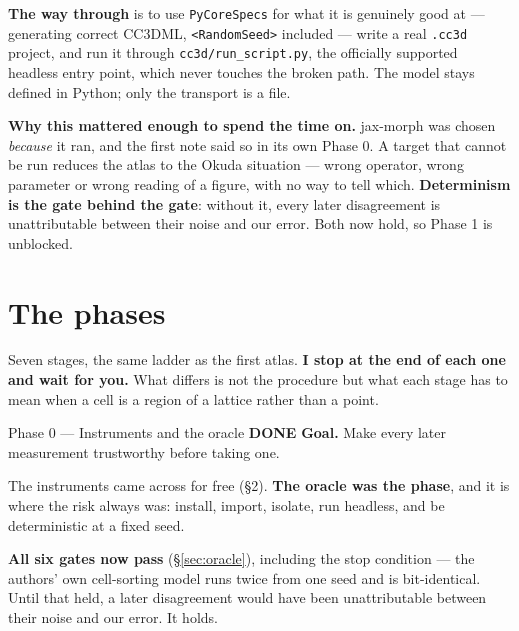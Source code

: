 \documentclass[11pt,a4paper]{article}
\newcommand{\code}[1]{\texttt{#1}}
\newcommand{\done}{\textcolor{good}{\textbf{DONE}}}
\begin{document}
\textbf{The way through} is to use \code{PyCoreSpecs} for what it is genuinely good at ---
generating correct CC3DML, \code{<RandomSeed>} included --- write a real \code{.cc3d} project, and
run it through \code{cc3d/run\_script.py}, the officially supported headless entry point, which
never touches the broken path. The model stays defined in Python; only the transport is a file.

\textbf{Why this mattered enough to spend the time on.} jax-morph was chosen \emph{because} it ran,
and the first note said so in its own Phase 0. A target that cannot be run reduces the atlas to the
Okuda situation --- wrong operator, wrong parameter or wrong reading of a figure, with no way to
tell which. \textbf{Determinism is the gate behind the gate}: without it, every later disagreement
is unattributable between their noise and our error. Both now hold, so Phase 1 is unblocked.

\section{The phases}

Seven stages, the same ladder as the first atlas. \textbf{I stop at the end of each one and wait
for you.} What differs is not the procedure but what each stage has to mean when a cell is a
region of a lattice rather than a point.

\begin{phasebox}{Phase 0 --- Instruments and the oracle \hfill \done}
\textbf{Goal.} Make every later measurement trustworthy before taking one.

The instruments came across for free (\S2). \textbf{The oracle was the phase}, and it is where the
risk always was: install, import, isolate, run headless, and be deterministic at a fixed seed.

\textbf{All six gates now pass} (\S\ref{sec:oracle}), including the stop condition --- the authors'
own cell-sorting model runs twice from one seed and is bit-identical. Until that held, a later
disagreement would have been unattributable between their noise and our error. It holds.
\end{phasebox}
\end{document}
